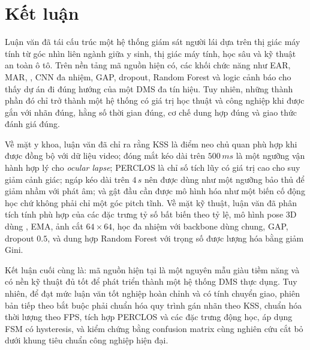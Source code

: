 \documentclass[12pt,a4paper]{article}
\begin{document}
\section{Kết luận}
Luận văn đã tái cấu trúc một hệ thống giám sát người lái dựa trên thị giác máy tính từ góc nhìn liên ngành giữa y sinh, thị giác máy tính, học sâu và kỹ thuật an toàn ô tô. Trên nền tảng mã nguồn hiện có, các khối chức năng như EAR, MAR, , CNN đa nhiệm, GAP, dropout, Random Forest và logic cảnh báo cho thấy dự án đi đúng hướng của một DMS đa tín hiệu. Tuy nhiên, những thành phần đó chỉ trở thành một hệ thống có giá trị học thuật và công nghiệp khi được gắn với nhãn đúng, hằng số thời gian đúng, cơ chế dung hợp đúng và giao thức đánh giá đúng.

Về mặt y khoa, luận văn đã chỉ ra rằng KSS là điểm neo chủ quan phù hợp khi được đồng bộ với dữ liệu video; đóng mắt kéo dài trên \(500\,ms\) là một ngưỡng vận hành hợp lý cho \textit{ocular lapse}; PERCLOS là chỉ số tích lũy có giá trị cao cho suy giảm cảnh giác; ngáp kéo dài trên \(4\,s\) nên được dùng như một ngưỡng bảo thủ để giảm nhầm với phát âm; và gật đầu cần được mô hình hóa như một biến cố động học chứ không phải chỉ một góc pitch tĩnh. Về mặt kỹ thuật, luận văn đã phân tích tính phù hợp của các đặc trưng tỷ số bất biến theo tỷ lệ, mô hình pose 3D dùng , EMA, ảnh cắt \(64\times64\), học đa nhiệm với backbone dùng chung, GAP, dropout \(0.5\), và dung hợp Random Forest với trọng số được lượng hóa bằng giảm Gini.

Kết luận cuối cùng là: mã nguồn hiện tại là một nguyên mẫu giàu tiềm năng và có nền kỹ thuật đủ tốt để phát triển thành một hệ thống DMS thực dụng. Tuy nhiên, để đạt mức luận văn tốt nghiệp hoàn chỉnh và có tính chuyển giao, phiên bản tiếp theo bắt buộc phải chuẩn hóa quy trình gán nhãn theo KSS, chuẩn hóa thời lượng theo FPS, tích hợp PERCLOS và các đặc trưng động học, áp dụng FSM có hysteresis, và kiểm chứng bằng confusion matrix cùng nghiên cứu cắt bỏ dưới khung tiêu chuẩn công nghiệp hiện đại.
\end{document}
